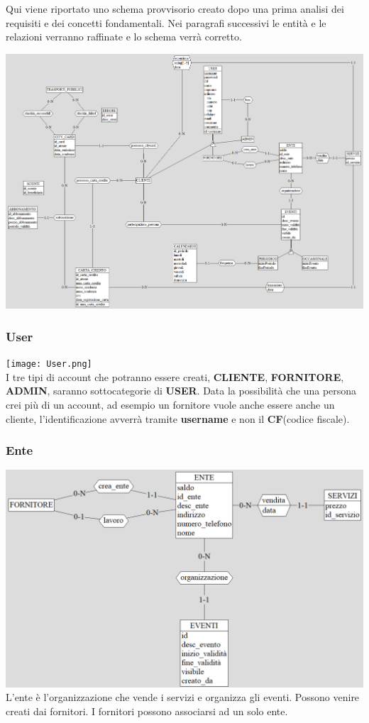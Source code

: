 Qui viene riportato uno schema provvisorio creato dopo una prima analisi dei requisiti e dei concetti fondamentali. 
Nei paragrafi successivi le entità e le relazioni verranno raffinate e lo schema verrà corretto.\\

\begin{center}
\centerline{\includegraphics[width=0.9\paperwidth]{images/schema_ER_iniziale.png}}
\end{center}

\subsubsection{User}
\texttt{[image: User.png]}\\
I tre tipi di account che potranno essere creati, \textbf{CLIENTE}, \textbf{FORNITORE}, \textbf{ADMIN},  saranno sottocategorie di \textbf{USER}. Data la possibilità che una persona crei più di un account, ad esempio un fornitore vuole anche essere anche un cliente, l'identificazione avverrà tramite \textbf{username} e non il \textbf{CF}(codice fiscale).

\subsubsection{Ente}
\includegraphics[width=0.95\columnwidth]{images/Ente.png} \\
L'ente è l'organizzazione che vende i servizi e organizza gli eventi. Possono venire creati dai fornitori. 
I fornitori possono associarsi ad un solo ente.


